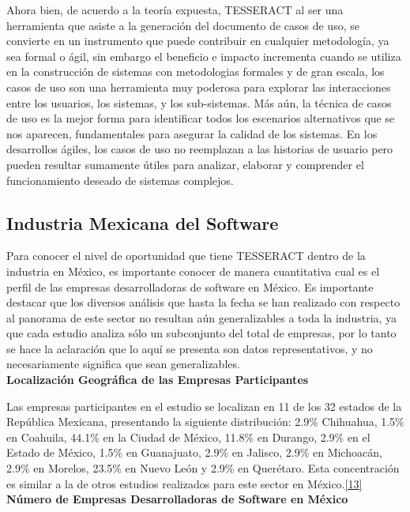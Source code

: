 Ahora bien, de acuerdo a la teoría expuesta, TESSERACT al ser una herramienta que asiste a la generación del documento de casos de uso, se convierte en un instrumento que puede contribuir en cualquier metodología, ya sea formal o ágil, sin embargo el beneficio e impacto incrementa cuando se utiliza en la construcción de sistemas con metodologias formales y de gran escala, los casos de uso son una herramienta muy poderosa para explorar las interacciones entre los usuarios, los sistemas, y los sub-sistemas. Más aún, la técnica de casos de uso es la mejor forma para identificar todos los escenarios alternativos que se nos aparecen, fundamentales para asegurar la calidad de los sistemas. En los desarrollos ágiles, los casos de uso no reemplazan a las historias de usuario pero pueden resultar sumamente útiles para analizar, elaborar y comprender el funcionamiento deseado de sistemas complejos.

\subsection{Industria Mexicana del Software}

Para conocer el nivel de oportunidad que tiene TESSERACT dentro de la industria en México, es importante conocer de manera cuantitativa cual es el perfil de las empresas desarrolladoras de software en México. Es importante destacar que los diversos análisis que hasta la fecha se han realizado con respecto al panorama de este sector no resultan aún generalizables a toda la industria, ya que cada estudio analiza sólo un subconjunto del total de empresas, por lo tanto se hace la aclaración que lo aquí se presenta son datos representativos, y no necesariamente significa que sean generalizables.\\

\textbf{Localización Geográfica de las Empresas Participantes}
 
Las empresas participantes en el estudio se localizan en 11 de los 32 estados de la República Mexicana, presentando la siguiente distribución: 2.9\% Chihuahua, 1.5\%  en Coahuila, 44.1\%  en la Ciudad de México, 11.8\%  en Durango, 2.9\%  en el Estado de México, 1.5\%  en Guanajuato, 2.9\%  en Jalisco, 2.9\%  en Michoacán, 2.9\%  en Morelos, 23.5\%  en Nuevo León y 2.9\%  en Querétaro. Esta concentración es similar a la de otros estudios realizados para este sector en México.\hyperlink{b13}{[13]}\\

\textbf{Número de Empresas Desarrolladoras de Software en México}

